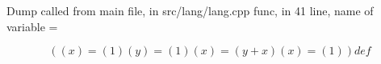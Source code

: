 \documentclass{article}
\begin{document}
Dump called from main file, in src/lang/lang.cpp func, in 41 line, name of variable = 


$$
((x) = (1)(y) = (1)(x) = (y + x)(x) = (1)) def 
$$
\end{document}
